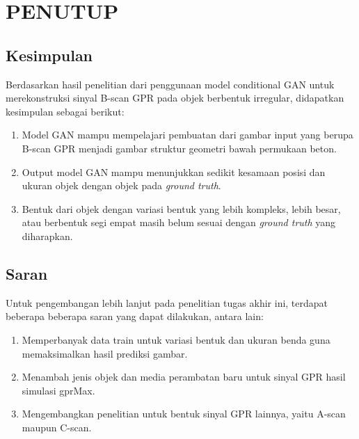 \chapter{PENUTUP}
\label{chap:penutup}


\section{Kesimpulan}
\label{sec:kesimpulan}

Berdasarkan hasil penelitian dari penggunaan model conditional GAN untuk merekonstruksi sinyal B-scan GPR pada objek berbentuk irregular, didapatkan kesimpulan sebagai berikut:

\begin{enumerate}[nolistsep]

  \item Model GAN mampu mempelajari pembuatan dari gambar input yang berupa B-scan GPR menjadi gambar struktur geometri bawah permukaan beton.
  
  \item Output model GAN mampu menunjukkan sedikit kesamaan posisi dan ukuran objek dengan objek pada \emph{ground truth}.

  \item Bentuk dari objek dengan variasi bentuk yang lebih kompleks, lebih besar, atau berbentuk segi empat masih belum sesuai dengan \emph{ground truth} yang diharapkan. 

\end{enumerate}

\section{Saran}
\label{chap:saran}

Untuk pengembangan lebih lanjut pada penelitian tugas akhir ini, terdapat beberapa beberapa saran yang dapat dilakukan, antara lain:

\begin{enumerate}[nolistsep]

  \item Memperbanyak data train untuk variasi bentuk dan ukuran benda guna memaksimalkan hasil prediksi gambar.

  \item Menambah jenis objek dan media perambatan baru untuk sinyal GPR hasil simulasi gprMax.

  \item Mengembangkan penelitian untuk bentuk sinyal GPR lainnya, yaitu A-scan maupun C-scan.

\end{enumerate}
